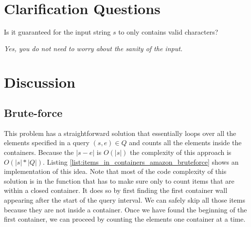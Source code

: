 \section{Clarification Questions}

\begin{QandA}
	\item \begin{questionitem} \begin{question} Is it guaranteed for the input string $s$ to only contains valid characters?  \end{question} 	 
    \begin{answered}
		\textit{Yes, you do not need to worry about the sanity of the input.}
	\end{answered} \end{questionitem}
\end{QandA}

\section{Discussion}
\label{items_in_containers_amazon:sec:discussion}



\subsection{Brute-force}
\label{items_in_containers_amazon:sec:bruteforce}
This problem has a straightforward solution that essentially loops over all the elements  specified in
a query $(s,e) \in Q$ and counts all the elements inside the containers. Because the $|s-e|$ is
$O(|s|)$ the complexity of this approach is $O(|s|*|Q|)$. Listing
\ref{list:items_in_containers_amazon_bruteforce} shows an implementation of this idea. Note that
most of the code complexity of this solution is in the  function
that has to make sure only to count items that are within a closed container. It does so by first
finding the first container wall appearing after the start of the query interval. We can safely skip
all those items because they are not inside a container. Once we have found the beginning of the
first container, we can proceed by counting the elements one container at a time. 


